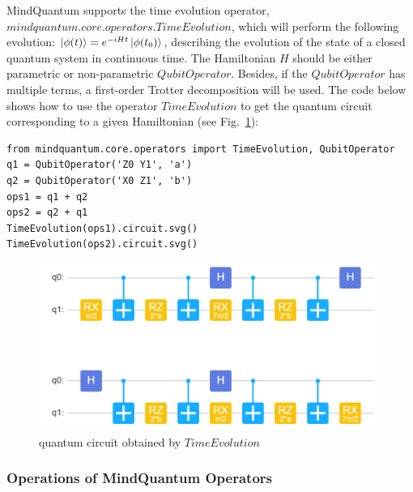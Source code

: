 MindQuantum supports the time evolution operator, $mindquantum.core.operators.TimeEvolution$, which will perform the following evolution: $\ket{\phi(t)} = e^{-iHt}\ket{\phi(t_0)}$, describing the evolution of the state of a closed quantum system in continuous time. The Hamiltonian $H$ should be either parametric or non-parametric $QubitOperator$. Besides, if the $QubitOperator$ has multiple terms, a first-order Trotter decomposition will be used. The code below shows how to use the operator $TimeEvolution$ to get the quantum circuit corresponding to a given Hamiltonian (see Fig.~\ref{2.5_TimeEvolution_circuit}):
\begin{lstlisting}
from mindquantum.core.operators import TimeEvolution, QubitOperator
q1 = QubitOperator('Z0 Y1', 'a')
q2 = QubitOperator('X0 Z1', 'b')
ops1 = q1 + q2
ops2 = q2 + q1
TimeEvolution(ops1).circuit.svg()
TimeEvolution(ops2).circuit.svg()
\end{lstlisting}
\begin{figure}[h]
    \centering
    \includegraphics[width=0.7\linewidth]{2.5_figures/2.5_TimeEvolution_circuit.png}
    \caption{quantum circuit obtained by $TimeEvolution$}
    \label{2.5_TimeEvolution_circuit}
\end{figure}


\subsubsection{Operations of MindQuantum Operators}

